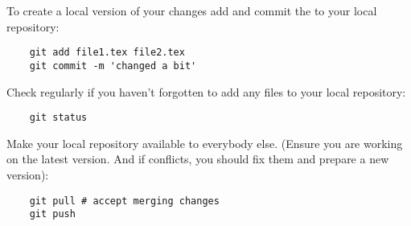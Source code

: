 To create a local version of your changes add and commit the to your local repository:

\begin{verbatim}
    git add file1.tex file2.tex
    git commit -m 'changed a bit'
\end{verbatim}

Check regularly if you haven't forgotten to add any files to your local repository:
\begin{verbatim}
    git status
\end{verbatim}

Make your local repository available to everybody else. (Ensure you are working on the latest version. And if conflicts, you should fix them and prepare a new version):
\begin{verbatim}
    git pull # accept merging changes
    git push
\end{verbatim}

